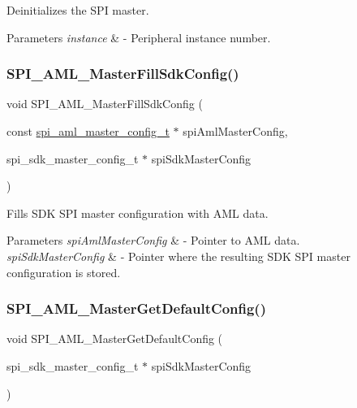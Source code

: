 Deinitializes the S\+PI master. 


\begin{DoxyParams}{Parameters}
{\em instance} & -\/ Peripheral instance number. \\
\hline
\end{DoxyParams}
\mbox{\label{group__function__group_gaaccd76ab37574aa23c0ab1e1e33ef7c5}} 
\subsubsection{\texorpdfstring{SPI\_AML\_MasterFillSdkConfig()}{SPI\_AML\_MasterFillSdkConfig()}}
{\footnotesize\ttfamily void S\+P\+I\+\_\+\+A\+M\+L\+\_\+\+Master\+Fill\+Sdk\+Config (\begin{DoxyParamCaption}\item[{const \mbox{\hyperlink{structspi__aml__master__config__t}{spi\+\_\+aml\+\_\+master\+\_\+config\+\_\+t}} $\ast$}]{spi\+Aml\+Master\+Config,  }\item[{spi\+\_\+sdk\+\_\+master\+\_\+config\+\_\+t $\ast$}]{spi\+Sdk\+Master\+Config }\end{DoxyParamCaption})}



Fills S\+DK S\+PI master configuration with A\+ML data. 


\begin{DoxyParams}{Parameters}
{\em spi\+Aml\+Master\+Config} & -\/ Pointer to A\+ML data. \\
\hline
{\em spi\+Sdk\+Master\+Config} & -\/ Pointer where the resulting S\+DK S\+PI master configuration is stored. \\
\hline
\end{DoxyParams}
\mbox{\label{group__function__group_ga81b9d9a7249971568d6fb7e589dcc84d}} 
\subsubsection{\texorpdfstring{SPI\_AML\_MasterGetDefaultConfig()}{SPI\_AML\_MasterGetDefaultConfig()}}
{\footnotesize\ttfamily void S\+P\+I\+\_\+\+A\+M\+L\+\_\+\+Master\+Get\+Default\+Config (\begin{DoxyParamCaption}\item[{spi\+\_\+sdk\+\_\+master\+\_\+config\+\_\+t $\ast$}]{spi\+Sdk\+Master\+Config }\end{DoxyParamCaption})}



